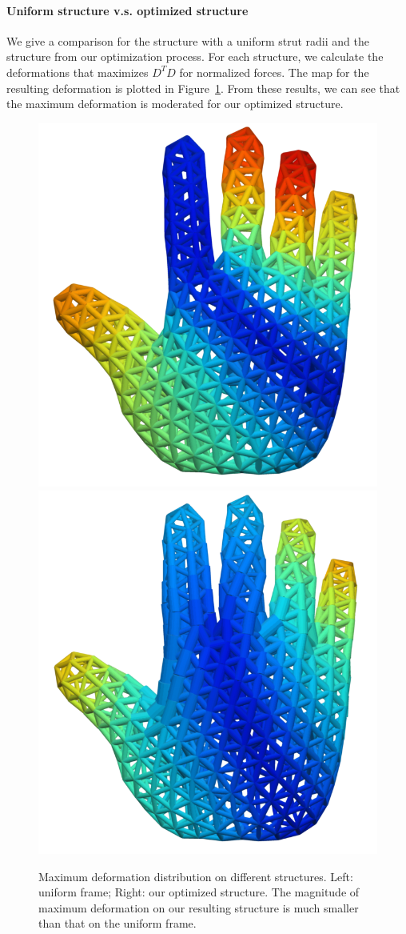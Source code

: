 \paragraph{Uniform structure v.s. optimized structure}
We give a comparison for the structure with a uniform strut radii and the
structure from our optimization process.
%
For each structure, we calculate the deformations that maximizes $D^TD$ for normalized forces.
The map for the resulting deformation is plotted in  Figure~\ref{fig:result-validation-max-deformation}.
From these results, we can see that the maximum deformation is moderated for our optimized structure.



\begin{figure}[h]
  \centering
  \includegraphics[width=.48\linewidth]{Figures/eigen/eigen_frame_uni.png}
  \includegraphics[width=.48\linewidth]{Figures/eigen/eigen_frame_ours.png}
  \caption{\label{fig:result-validation-max-deformation}
  Maximum deformation distribution on different structures.
            Left: uniform frame; Right: our optimized structure.
            The magnitude of maximum deformation on our resulting structure is much smaller than that on the uniform frame. }
\end{figure}



